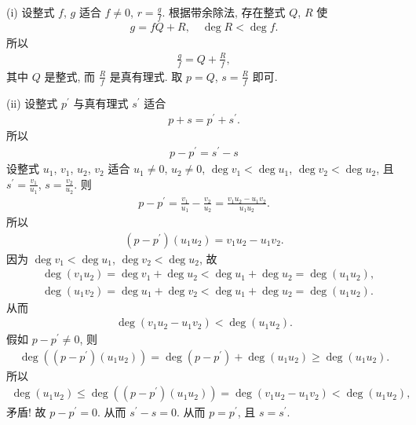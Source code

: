 \begin{pf}
    (i) 设整式 $f$, $g$ 适合 $f \neq 0$, $r = \frac{g}{f}$. 根据带余除法, 存在整式 $Q$, $R$ 使
    \begin{align*}
        g = fQ + R, \quad \deg R < \deg f.
    \end{align*}
    所以
    \begin{align*}
        \frac{g}{f} = Q + \frac{R}{f},
    \end{align*}
    其中 $Q$ 是整式, 而 $\frac{R}{f}$ 是真有理式. 取 $p = Q$, $s = \frac{R}{f}$ 即可.

    (ii) 设整式 $p^{\prime}$ 与真有理式 $s^{\prime}$ 适合
    \begin{align*}
        p + s = p^{\prime} + s^{\prime}.
    \end{align*}
    所以
    \begin{align*}
        p - p^{\prime} = s^{\prime} - s
    \end{align*}
    设整式 $u_1$, $v_1$, $u_2$, $v_2$ 适合 $u_1 \neq 0$, $u_2 \neq 0$, $\deg v_1 < \deg u_1$, $\deg v_2 < \deg u_2$, 且 $s^{\prime} = \frac{v_1}{u_1}$, $s = \frac{v_2}{u_2}$. 则
    \begin{align*}
        p - p^{\prime} = \frac{v_1}{u_1} - \frac{v_2}{u_2} = \frac{v_1 u_2 - u_1 v_2}{u_1 u_2}.
    \end{align*}
    所以
    \begin{align*}
        (p - p^{\prime}) (u_1 u_2) = v_1 u_2 - u_1 v_2.
    \end{align*}
    因为 $\deg v_1 < \deg u_1$, $\deg v_2 < \deg u_2$, 故
    \begin{align*}
         & \deg {(v_1 u_2)} = \deg v_1 + \deg u_2 < \deg u_1 + \deg u_2 = \deg {(u_1 u_2)}, \\
         & \deg {(u_1 v_2)} = \deg u_1 + \deg v_2 < \deg u_1 + \deg u_2 = \deg {(u_1 u_2)}.
    \end{align*}
    从而
    \begin{align*}
        \deg {(v_1 u_2 - u_1 v_2)} < \deg {(u_1 u_2)}.
    \end{align*}
    假如 $p - p^{\prime} \neq 0$, 则
    \begin{align*}
        \deg {((p - p^{\prime})(u_1 u_2))} = \deg {(p - p^{\prime})} + \deg {(u_1 u_2)} \geq \deg {(u_1 u_2)}.
    \end{align*}
    所以
    \begin{align*}
        \deg {(u_1 u_2)} \leq \deg {((p - p^{\prime})(u_1 u_2))} = \deg {(v_1 u_2 - u_1 v_2)} < \deg {(u_1 u_2)},
    \end{align*}
    矛盾! 故 $p - p^{\prime} = 0$. 从而 $s^{\prime} - s = 0$. 从而 $p = p^{\prime}$, 且 $s = s^{\prime}$.
\end{pf}

